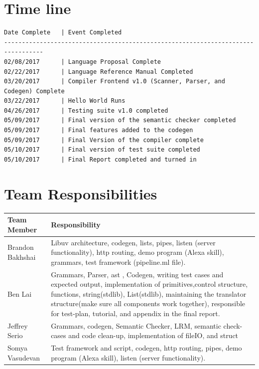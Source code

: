 \documentclass[./Report_main.tex]{subfiles}
\begin{document}
\section{Time line}
\begin{lstlisting} 
Date Complete	| Event Completed
---------------------------------------------------------------------------------
02/08/2017		| Language Proposal Complete
02/22/2017		| Language Reference Manual Completed
03/20/2017		| Compiler Frontend v1.0 (Scanner, Parser, and Codegen) Complete
03/22/2017		| Hello World Runs
04/26/2017		| Testing suite v1.0 completed
05/09/2017		| Final version of the semantic checker completed
05/09/2017		| Final features added to the codegen
05/09/2017		| Final Version of the compiler complete
05/10/2017		| Final version of test suite completed
05/10/2017		| Final Report completed and turned in
\end{lstlisting}
\section{Team Responsibilities}
\begin{tabu} to 1\textwidth { | X[c] | X[c] | }
 \hline
 Team Member & Responsibility \\ 
 \hline
 Brandon Bakhshai & Libuv architecture, codegen, lists, pipes, listen (server functionality), http routing, demo program (Alexa skill), grammars, test framework (pipeline.ml file).
\\
 \hline
Ben Lai  & Grammars, Parser, ast , Codegen, writing test cases and expected output, implementation of primitives,control structure, functions, string(stdlib), List(stdlib), maintaining the translator structure(make sure all components work together), responsible for test-plan, tutorial, and appendix in the final report.
\\
 \hline
Jeffrey Serio  & Grammars, codegen, Semantic Checker, LRM, semantic check-cases and code clean-up, implementation of fileIO, and struct
\\
\hline
Somya Vasudevan & Test framework and script, codegen, http routing, pipes, demo program (Alexa skill), listen (server functionality).\\
\hline
\end{tabu}
\end{document}
